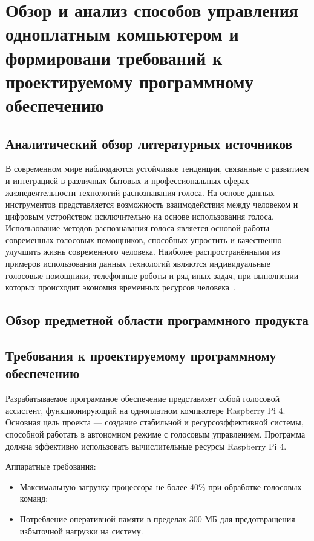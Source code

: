 \section{Обзор и анализ способов управления одноплатным компьютером и формировани требований к проектируемому программному обеспечению}

\subsection{Аналитический обзор литературных источников}

В современном мире наблюдаются устойчивые тенденции, связанные с развитием и интеграцией в различных бытовых и профессиональных сферах жизнедеятельности технологий распознавания голоса. На основе данных инструментов представляется возможность взаимодействия между человеком и цифровым устройством исключительно на основе использования голоса. Использование методов распознавания голоса является основой работы современных голосовых помощников, способных упростить и качественно улучшить жизнь современного человека. Наиболее распространёнными из примеров использования данных технологий являются индивидуальные голосовые помощники, телефонные роботы и ряд иных задач, при выполнении которых
происходит экономия временных ресурсов человека~\cite{Hein}.

\subsection{Обзор предметной области программного продукта}

\subsection{Требования к проектируемому программному обеспечению}

Разрабатываемое программное обеспечение представляет собой голосовой ассистент, функционирующий на одноплатном компьютере Raspberry Pi 4.
Основная цель проекта — создание стабильной и ресурсоэффективной системы, способной работать в автономном режиме с голосовым управлением.
Программа должна эффективно использовать вычислительные ресурсы Raspberry Pi 4.

Аппаратные требования:
\begin{itemize}
	\item Максимальную загрузку процессора не более 40\% при обработке голосовых команд;
	\item Потребление оперативной памяти в пределах 300 МБ для предотвращения избыточной нагрузки на систему.
\end{itemize}

